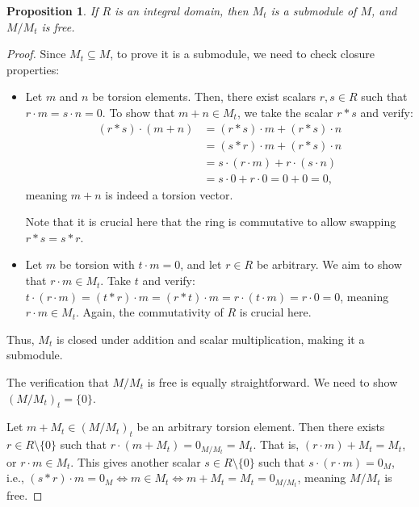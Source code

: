 \documentclass{article}
\newif\ifusemulticols
\theoremstyle{definition}
\theoremstyle{remark}
\theoremstyle{plain}
\theoremstyle{plain}
\newtheorem{prop}[theorem]{Proposition}
\newenvironment{mymulticols}
    { \ifusemulticols \begin{multicols}{2} \fi }
    { \ifusemulticols \end{multicols} \fi }
\begin{document}
\begin{mymulticols}
\begin{prop}
    \label{torsion-prop}
    If $R$ is an integral domain, then $M_t$ is a submodule of $M$, and $M / M_t$ is free.
\end{prop}
\begin{proof}
    Since $M_t \subseteq M$, to prove it is a submodule, we need to check closure properties:
    \begin{itemize}
        \item Let $m$ and $n$ be torsion elements. Then, there exist scalars $r, s \in R$ such that
            $r \cdot m = s \cdot n = 0$. To show that $m + n \in M_t$, we take the scalar $r * s$ and verify:
            \begin{align*}
                (r * s) \cdot (m + n) &= (r * s) \cdot m + (r * s) \cdot n \\
                                &= (s * r) \cdot m + (r * s) \cdot n \\
                                &= s \cdot (r \cdot m) + r \cdot (s \cdot n) \\
                                &= s \cdot 0 + r \cdot 0 = 0 + 0 = 0,
            \end{align*}
            meaning $m + n$ is indeed a torsion vector.

            Note that it is crucial here that the ring is commutative to allow swapping
            $r * s = s * r$.
        \item Let $m$ be torsion with $t \cdot m = 0$, and let $r \in R$ be arbitrary.
            We aim to show that $r \cdot m \in M_t$.
            Take $t$ and verify: $t \cdot (r \cdot m) = (t * r) \cdot m = (r * t) \cdot m = r \cdot (t
            \cdot m) = r \cdot 0 = 0$, meaning $r \cdot m \in M_t$. Again, the commutativity of $R$ is
            crucial here.
    \end{itemize}
    Thus, $M_t$ is closed under addition and scalar multiplication, making it a submodule.

    The verification that $M / M_t$ is free is equally straightforward. We need to show $(M / M_t)_t = \{0\}$.

    Let $m + M_t \in (M / M_t)_t$ be an arbitrary torsion element. Then there exists $r \in R
    \setminus \{0\}$ such that $r \cdot (m + M_t) = 0_{M / M_t} = M_t$. 
    That is, $(r \cdot m) + M_t = M_t$, or $r \cdot m \in M_t$.
    This gives another scalar $s \in R \setminus \{0\}$ such that $s \cdot (r \cdot m) = 0_M$, i.e.,
    $(s * r) \cdot m = 0_M \Leftrightarrow m \in M_t \Leftrightarrow m + M_t = M_t = 0_{M / M_t}$,
    meaning $M / M_t$ is free.
\end{proof}


\end{mymulticols}
\end{document}
